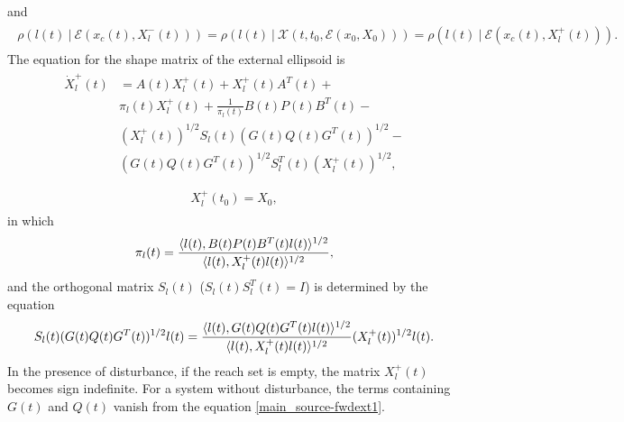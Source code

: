 \documentclass[letterpaper,10pt,english]{sphinxmanual}
\begin{document}
and
\label{main_source:equation-fwdtightness}\begin{gather}
\begin{split}\rho(l(t) ~|~ {\mathcal E}(x_c(t), X^-_l(t))) =
\rho(l(t) ~|~ {\mathcal X}(t, t_0, {\mathcal E}(x_0,X_0))) =
\rho(l(t) ~|~ {\mathcal E}(x_c(t), X^+_l(t))) .\end{split}\label{main_source-fwdtightness}
\end{gather}
The equation for the shape matrix of the external ellipsoid is
\label{main_source:equation-fwdext1}\begin{gather}
\begin{split}\dot{X}^+_l(t) & = A(t)X^+_l(t) + X^+_l(t)A^T(t) +\nonumber \\
&\pi_l(t)X^+_l(t) + \frac{1}{\pi_l(t)}B(t)P(t)B^T(t) -\nonumber \\
& (X_l^{+}(t))^{1/2}S_l(t)(G(t)Q(t)G^T(t))^{1/2} \nonumber -\\
& (G(t)Q(t)G^T(t))^{1/2}S_l^T(t)(X_l^{+}(t))^{1/2}, \\\end{split}\label{main_source-fwdext1}
\end{gather}\label{main_source:equation-fwdext2}\begin{gather}
\begin{split}X^+_l(t_0) =X_0,\end{split}\label{main_source-fwdext2}
\end{gather}
in which
\begin{gather}
\begin{split}\pi_l(t) = \frac{\langle l(t),
B(t)P(t)B^T(t)l(t)\rangle^{1/2}}{\langle l(t), X^+_l(t)l(t)\rangle^{1/2}},\end{split}\notag
\end{gather}
and the orthogonal matrix $S_l(t)$ ($S_l(t)S_l^T(t) = I$)
is determined by the equation
\begin{gather}
\begin{split}S_l(t)(G(t)Q(t)G^T(t))^{1/2}l(t) = \frac{\langle l(t),
G(t)Q(t)G^T(t)l(t)\rangle^{1/2}}{\langle l(t),
X_l^+(t)l(t)\rangle^{1/2}}(X_l^{+}(t))^{1/2}l(t).\end{split}\notag
\end{gather}
In the presence of disturbance, if the reach set is empty, the matrix
$X^+_l(t)$ becomes sign indefinite. For a system without
disturbance, the terms containing $G(t)$ and $Q(t)$ vanish
from the equation \eqref{main_source-fwdext1}.
\end{document}
